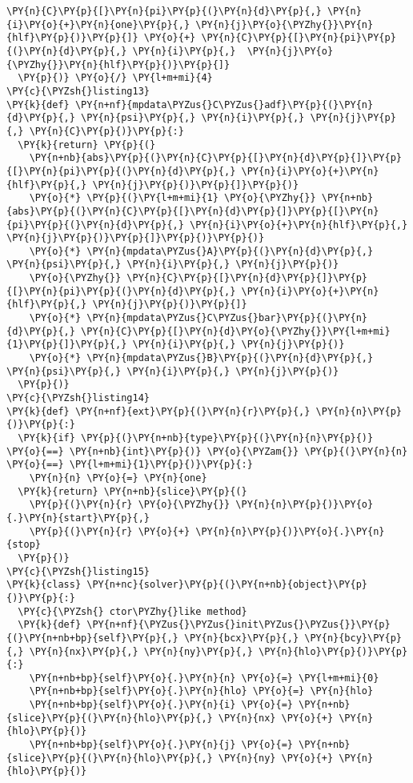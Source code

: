 \begin{Verbatim}[commandchars=\\\{\}]
    \PY{n}{C}\PY{p}{[}\PY{n}{pi}\PY{p}{(}\PY{n}{d}\PY{p}{,} \PY{n}{i}\PY{o}{+}\PY{n}{one}\PY{p}{,} \PY{n}{j}\PY{o}{\PYZhy{}}\PY{n}{hlf}\PY{p}{)}\PY{p}{]} \PY{o}{+} \PY{n}{C}\PY{p}{[}\PY{n}{pi}\PY{p}{(}\PY{n}{d}\PY{p}{,} \PY{n}{i}\PY{p}{,}  \PY{n}{j}\PY{o}{\PYZhy{}}\PY{n}{hlf}\PY{p}{)}\PY{p}{]} 
  \PY{p}{)} \PY{o}{/} \PY{l+m+mi}{4}
\PY{c}{\PYZsh{}listing13}
\PY{k}{def} \PY{n+nf}{mpdata\PYZus{}C\PYZus{}adf}\PY{p}{(}\PY{n}{d}\PY{p}{,} \PY{n}{psi}\PY{p}{,} \PY{n}{i}\PY{p}{,} \PY{n}{j}\PY{p}{,} \PY{n}{C}\PY{p}{)}\PY{p}{:}
  \PY{k}{return} \PY{p}{(}
    \PY{n+nb}{abs}\PY{p}{(}\PY{n}{C}\PY{p}{[}\PY{n}{d}\PY{p}{]}\PY{p}{[}\PY{n}{pi}\PY{p}{(}\PY{n}{d}\PY{p}{,} \PY{n}{i}\PY{o}{+}\PY{n}{hlf}\PY{p}{,} \PY{n}{j}\PY{p}{)}\PY{p}{]}\PY{p}{)} 
    \PY{o}{*} \PY{p}{(}\PY{l+m+mi}{1} \PY{o}{\PYZhy{}} \PY{n+nb}{abs}\PY{p}{(}\PY{n}{C}\PY{p}{[}\PY{n}{d}\PY{p}{]}\PY{p}{[}\PY{n}{pi}\PY{p}{(}\PY{n}{d}\PY{p}{,} \PY{n}{i}\PY{o}{+}\PY{n}{hlf}\PY{p}{,} \PY{n}{j}\PY{p}{)}\PY{p}{]}\PY{p}{)}\PY{p}{)} 
    \PY{o}{*} \PY{n}{mpdata\PYZus{}A}\PY{p}{(}\PY{n}{d}\PY{p}{,} \PY{n}{psi}\PY{p}{,} \PY{n}{i}\PY{p}{,} \PY{n}{j}\PY{p}{)}
    \PY{o}{\PYZhy{}} \PY{n}{C}\PY{p}{[}\PY{n}{d}\PY{p}{]}\PY{p}{[}\PY{n}{pi}\PY{p}{(}\PY{n}{d}\PY{p}{,} \PY{n}{i}\PY{o}{+}\PY{n}{hlf}\PY{p}{,} \PY{n}{j}\PY{p}{)}\PY{p}{]} 
    \PY{o}{*} \PY{n}{mpdata\PYZus{}C\PYZus{}bar}\PY{p}{(}\PY{n}{d}\PY{p}{,} \PY{n}{C}\PY{p}{[}\PY{n}{d}\PY{o}{\PYZhy{}}\PY{l+m+mi}{1}\PY{p}{]}\PY{p}{,} \PY{n}{i}\PY{p}{,} \PY{n}{j}\PY{p}{)}
    \PY{o}{*} \PY{n}{mpdata\PYZus{}B}\PY{p}{(}\PY{n}{d}\PY{p}{,} \PY{n}{psi}\PY{p}{,} \PY{n}{i}\PY{p}{,} \PY{n}{j}\PY{p}{)}
  \PY{p}{)}
\PY{c}{\PYZsh{}listing14}
\PY{k}{def} \PY{n+nf}{ext}\PY{p}{(}\PY{n}{r}\PY{p}{,} \PY{n}{n}\PY{p}{)}\PY{p}{:}
  \PY{k}{if} \PY{p}{(}\PY{n+nb}{type}\PY{p}{(}\PY{n}{n}\PY{p}{)} \PY{o}{==} \PY{n+nb}{int}\PY{p}{)} \PY{o}{\PYZam{}} \PY{p}{(}\PY{n}{n} \PY{o}{==} \PY{l+m+mi}{1}\PY{p}{)}\PY{p}{:} 
    \PY{n}{n} \PY{o}{=} \PY{n}{one}
  \PY{k}{return} \PY{n+nb}{slice}\PY{p}{(}
    \PY{p}{(}\PY{n}{r} \PY{o}{\PYZhy{}} \PY{n}{n}\PY{p}{)}\PY{o}{.}\PY{n}{start}\PY{p}{,} 
    \PY{p}{(}\PY{n}{r} \PY{o}{+} \PY{n}{n}\PY{p}{)}\PY{o}{.}\PY{n}{stop}
  \PY{p}{)}
\PY{c}{\PYZsh{}listing15}
\PY{k}{class} \PY{n+nc}{solver}\PY{p}{(}\PY{n+nb}{object}\PY{p}{)}\PY{p}{:}
  \PY{c}{\PYZsh{} ctor\PYZhy{}like method}
  \PY{k}{def} \PY{n+nf}{\PYZus{}\PYZus{}init\PYZus{}\PYZus{}}\PY{p}{(}\PY{n+nb+bp}{self}\PY{p}{,} \PY{n}{bcx}\PY{p}{,} \PY{n}{bcy}\PY{p}{,} \PY{n}{nx}\PY{p}{,} \PY{n}{ny}\PY{p}{,} \PY{n}{hlo}\PY{p}{)}\PY{p}{:}
    \PY{n+nb+bp}{self}\PY{o}{.}\PY{n}{n} \PY{o}{=} \PY{l+m+mi}{0}
    \PY{n+nb+bp}{self}\PY{o}{.}\PY{n}{hlo} \PY{o}{=} \PY{n}{hlo}
    \PY{n+nb+bp}{self}\PY{o}{.}\PY{n}{i} \PY{o}{=} \PY{n+nb}{slice}\PY{p}{(}\PY{n}{hlo}\PY{p}{,} \PY{n}{nx} \PY{o}{+} \PY{n}{hlo}\PY{p}{)}
    \PY{n+nb+bp}{self}\PY{o}{.}\PY{n}{j} \PY{o}{=} \PY{n+nb}{slice}\PY{p}{(}\PY{n}{hlo}\PY{p}{,} \PY{n}{ny} \PY{o}{+} \PY{n}{hlo}\PY{p}{)}


\end{Verbatim}
